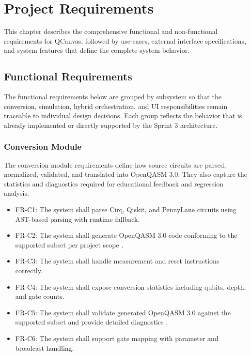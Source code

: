 \chapter{Project Requirements}

This chapter describes the comprehensive functional and non-functional requirements for QCanvas, followed by use-cases, external interface specifications, and system features that define the complete system behavior.

\section{Functional Requirements}

The functional requirements below are grouped by subsystem so that the conversion, simulation, hybrid orchestration, and UI responsibilities remain traceable to individual design decisions. Each group reflects the behavior that is already implemented or directly supported by the Sprint 3 architecture.

\subsection{Conversion Module}
The conversion module requirements define how source circuits are parsed, normalized, validated, and translated into OpenQASM 3.0. They also capture the statistics and diagnostics required for educational feedback and regression analysis.
\begin{itemize}
    \item FR-C1: The system shall parse Cirq, Qiskit, and PennyLane circuits using AST-based parsing with runtime fallback.
    \item FR-C2: The system shall generate OpenQASM 3.0 code conforming to the supported subset per project scope \cite{cross2021openqasm}.
    \item FR-C3: The system shall handle measurement and reset instructions correctly.
    \item FR-C4: The system shall expose conversion statistics including qubits, depth, and gate counts.
    \item FR-C5: The system shall validate generated OpenQASM 3.0 against the supported subset and provide detailed diagnostics \cite{cross2017openqasm}.
    \item FR-C6: The system shall support gate mapping with parameter and broadcast handling.
\end{itemize}

